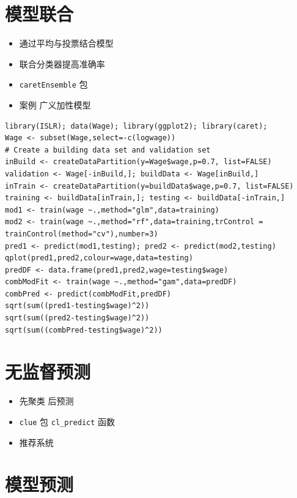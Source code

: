 \documentclass[
]{book}
\providecommand{\tightlist}{%
  \setlength{\itemsep}{0pt}\setlength{\parskip}{0pt}}
\begin{document}
\hypertarget{ux6a21ux578bux8054ux5408}{%
\section{模型联合}\label{ux6a21ux578bux8054ux5408}}

\begin{itemize}
\tightlist
\item
  通过平均与投票结合模型
\item
  联合分类器提高准确率
\item
  \texttt{caretEnsemble} 包
\item
  案例 广义加性模型
\end{itemize}

\begin{verbatim}
library(ISLR); data(Wage); library(ggplot2); library(caret);
Wage <- subset(Wage,select=-c(logwage))
# Create a building data set and validation set
inBuild <- createDataPartition(y=Wage$wage,p=0.7, list=FALSE)
validation <- Wage[-inBuild,]; buildData <- Wage[inBuild,]
inTrain <- createDataPartition(y=buildData$wage,p=0.7, list=FALSE)
training <- buildData[inTrain,]; testing <- buildData[-inTrain,]
mod1 <- train(wage ~.,method="glm",data=training)
mod2 <- train(wage ~.,method="rf",data=training,trControl = trainControl(method="cv"),number=3)
pred1 <- predict(mod1,testing); pred2 <- predict(mod2,testing)
qplot(pred1,pred2,colour=wage,data=testing)
predDF <- data.frame(pred1,pred2,wage=testing$wage)
combModFit <- train(wage ~.,method="gam",data=predDF)
combPred <- predict(combModFit,predDF)
sqrt(sum((pred1-testing$wage)^2))
sqrt(sum((pred2-testing$wage)^2))
sqrt(sum((combPred-testing$wage)^2))
\end{verbatim}

\hypertarget{ux65e0ux76d1ux7763ux9884ux6d4b}{%
\section{无监督预测}\label{ux65e0ux76d1ux7763ux9884ux6d4b}}

\begin{itemize}
\tightlist
\item
  先聚类 后预测
\item
  \texttt{clue} 包 \texttt{cl\_predict} 函数
\item
  推荐系统
\end{itemize}

\hypertarget{ux6a21ux578bux9884ux6d4b}{%
\section{模型预测}\label{ux6a21ux578bux9884ux6d4b}}
\end{document}
